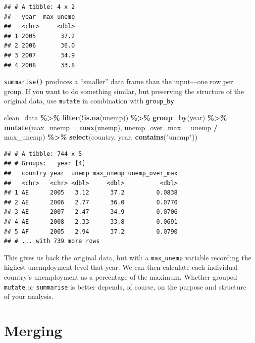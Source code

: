 \documentclass[
  12pt,
  oneside,openany]{book}
\newenvironment{Shaded}{\begin{snugshade}}{\end{snugshade}}
\newcommand{\DataTypeTok}[1]{\textcolor[rgb]{0.13,0.29,0.53}{#1}}
\newcommand{\KeywordTok}[1]{\textcolor[rgb]{0.13,0.29,0.53}{\textbf{#1}}}
\newcommand{\NormalTok}[1]{#1}
\newcommand{\OperatorTok}[1]{\textcolor[rgb]{0.81,0.36,0.00}{\textbf{#1}}}
\newcommand{\StringTok}[1]{\textcolor[rgb]{0.31,0.60,0.02}{#1}}
\begin{document}
\begin{verbatim}
## # A tibble: 4 x 2
##   year  max_unemp
##   <chr>     <dbl>
## 1 2005       37.2
## 2 2006       36.0
## 3 2007       34.9
## 4 2008       33.8
\end{verbatim}

\texttt{summarise()} produces a ``smaller'' data frame than the input---one row per group. If you want to do something similar, but preserving the structure of the original data, use \texttt{mutate} in combination with \texttt{group\_by}.

\begin{Shaded}
\begin{Highlighting}[]
\NormalTok{clean\_data }\OperatorTok{\%>\%}
\StringTok{  }\KeywordTok{filter}\NormalTok{(}\OperatorTok{!}\KeywordTok{is.na}\NormalTok{(unemp)) }\OperatorTok{\%>\%}
\StringTok{  }\KeywordTok{group\_by}\NormalTok{(year) }\OperatorTok{\%>\%}
\StringTok{  }\KeywordTok{mutate}\NormalTok{(}\DataTypeTok{max\_unemp =} \KeywordTok{max}\NormalTok{(unemp),}
         \DataTypeTok{unemp\_over\_max =}\NormalTok{ unemp }\OperatorTok{/}\StringTok{ }\NormalTok{max\_unemp) }\OperatorTok{\%>\%}
\StringTok{  }\KeywordTok{select}\NormalTok{(country, year, }\KeywordTok{contains}\NormalTok{(}\StringTok{"unemp"}\NormalTok{))}
\end{Highlighting}
\end{Shaded}

\begin{verbatim}
## # A tibble: 744 x 5
## # Groups:   year [4]
##   country year  unemp max_unemp unemp_over_max
##   <chr>   <chr> <dbl>     <dbl>          <dbl>
## 1 AE      2005   3.12      37.2         0.0838
## 2 AE      2006   2.77      36.0         0.0770
## 3 AE      2007   2.47      34.9         0.0706
## 4 AE      2008   2.33      33.8         0.0691
## 5 AF      2005   2.94      37.2         0.0790
## # ... with 739 more rows
\end{verbatim}

This gives us back the original data, but with a \texttt{max\_unemp} variable recording the highest unemployment level that year. We can then calculate each individual country's unemployment as a percentage of the maximum. Whether grouped \texttt{mutate} or \texttt{summarise} is better depends, of course, on the purpose and structure of your analysis.

\hypertarget{merging}{%
\section{Merging}\label{merging}}
\end{document}

